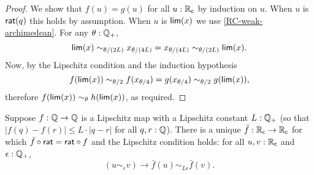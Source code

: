 \begin{proof}
  We show that $f(u) = g(u)$ for all $u : \mathbb{R}_\mathsf{c}$ by induction on $u$. When $u$ is
  $\mathsf{rat}(q)$ this holds by assumption. When $u$ is $\mathsf{lim}(x)$ we use
  \autoref{RC-weak-archimedean}. For any $\theta : \mathbb{Q}_{+}$,
  \begin{equation*}
    \mathsf{lim}(x) \sim_{\theta/(2 L)}
    x_{\theta/(4 L)} =
    x_{\theta/(4 L)} \sim_{\theta/(2 L)}
    \mathsf{lim}(x).
  \end{equation*}
  Now, by the Lipschitz condition and the induction hypothesis
  \begin{equation*}
    f(\mathsf{lim}(x)) \sim_{\theta/2}
    f(x_{\theta/4}) =
    g(x_{\theta/4}) \sim_{\theta/2}
    g(\mathsf{lim}(x)),
  \end{equation*}
  therefore $f(\mathsf{lim}(x)) \sim_\theta h(\mathsf{lim}(x))$, as required.
\end{proof}

\begin{lem}\label{RC-extend-Q-Lipschitz}
  Suppose $f : \mathbb{Q} \to \mathbb{Q}$ is a Lipschitz map with a Lipschitz constant $L : \mathbb{Q}_{+}$ (so that
  $|f(q) - f(r)| \leq L \cdot |q - r|$ for all $q, r : \mathbb{Q}$). There is a unique $\bar{f} :
  \mathbb{R}_\mathsf{c} \to \mathbb{R}_\mathsf{c}$ for which $\bar{f} \circ \mathsf{rat} = \mathsf{rat} \circ f$ and the Lipschitz
  condition holds: for all $u, v : \mathbb{R}_\mathsf{c}$ and $\epsilon : \mathbb{Q}_{+}$,
  \begin{equation*}
    (u \sim_\epsilon v) \to \bar{f}(u) \sim_{L \epsilon} \bar{f}(v).
  \end{equation*}
\end{lem}

